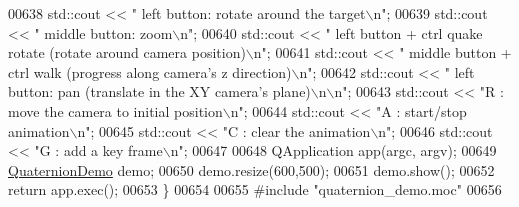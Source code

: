 \begin{DoxyCode}
00638   std::cout << \textcolor{stringliteral}{"  left button:           rotate around the target\(\backslash\)n"};
00639   std::cout << \textcolor{stringliteral}{"  middle button:         zoom\(\backslash\)n"};
00640   std::cout << \textcolor{stringliteral}{"  left button + ctrl     quake rotate (rotate around camera position)\(\backslash\)n"};
00641   std::cout << \textcolor{stringliteral}{"  middle button + ctrl   walk (progress along camera's z direction)\(\backslash\)n"};
00642   std::cout << \textcolor{stringliteral}{"  left button:           pan (translate in the XY camera's plane)\(\backslash\)n\(\backslash\)n"};
00643   std::cout << \textcolor{stringliteral}{"R : move the camera to initial position\(\backslash\)n"};
00644   std::cout << \textcolor{stringliteral}{"A : start/stop animation\(\backslash\)n"};
00645   std::cout << \textcolor{stringliteral}{"C : clear the animation\(\backslash\)n"};
00646   std::cout << \textcolor{stringliteral}{"G : add a key frame\(\backslash\)n"};
00647 
00648   QApplication app(argc, argv);
00649   \hyperlink{class_quaternion_demo}{QuaternionDemo} demo;
00650   demo.resize(600,500);
00651   demo.show();
00652   \textcolor{keywordflow}{return} app.exec();
00653 \}
00654 
00655 \textcolor{preprocessor}{#include "quaternion\_demo.moc"}
00656 
\end{DoxyCode}
